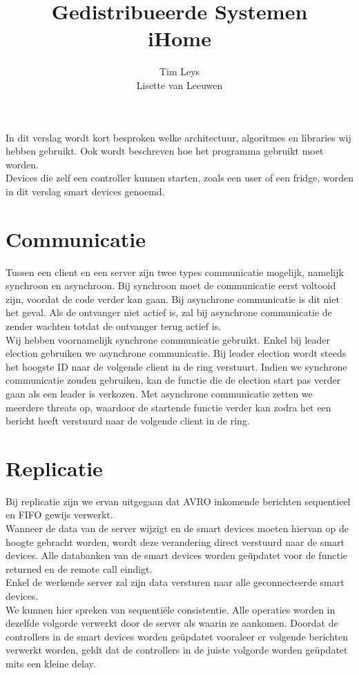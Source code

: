 \documentclass[a4paper]{article}
\title{ %
	Gedistribueerde Systemen \\
	\large iHome
	}
\author{ %
	Tim Leys \\
	Lisette van Leeuwen \\
	}
\begin{document}
	\maketitle
	
	In dit verslag wordt kort besproken welke architectuur, algoritmes en libraries wij hebben gebruikt. Ook wordt beschreven hoe het programma gebruikt moet worden. \\
	Devices die zelf een controller kunnen starten, zoals een user of een fridge, worden in dit verslag smart devices genoemd. 
	
	\section{Communicatie}
		Tussen een client en een server zijn twee types communicatie mogelijk, namelijk synchroon en asynchroon. Bij synchroon moet de communicatie eerst voltooid zijn, voordat de code verder kan gaan. Bij asynchrone communicatie is dit niet het geval. Als de ontvanger niet actief is, zal bij asynchrone communicatie de zender wachten totdat de ontvanger terug actief is. \\
		Wij hebben voornamelijk synchrone communicatie gebruikt. Enkel bij leader election gebruiken we asynchrone communicatie. Bij leader election wordt steeds het hoogste ID naar de volgende client in de ring verstuurt. Indien we synchrone communicatie zouden gebruiken, kan de functie die de election start pas verder gaan als een leader is verkozen. Met asynchrone communicatie zetten we meerdere threats op, waardoor de startende functie verder kan zodra het een bericht heeft verstuurd naar de volgende client in de ring. 
		
	\section{Replicatie}
		Bij replicatie zijn we ervan uitgegaan dat AVRO inkomende berichten sequentieel en FIFO gewijs verwerkt. \\
		Wanneer de data van de server wijzigt en de smart devices moeten hiervan op de hoogte gebracht worden, wordt deze verandering direct verstuurd naar de smart devices. Alle databanken van de smart devices worden ge\"updatet voor de functie returned en de remote call eindigt. \\
		Enkel de werkende server zal zijn data versturen naar alle geconnecteerde smart devices. \\
		We kunnen hier spreken van sequenti\"ele consistentie. Alle operaties worden in dezelfde volgorde verwerkt door de server als waarin ze aankomen. Doordat de controllers in de smart devices worden ge\"updatet vooraleer er volgende berichten verwerkt worden, geldt dat de controllers in de juiste volgorde worden ge\"updatet mits een kleine delay.	
			
\end{document}
